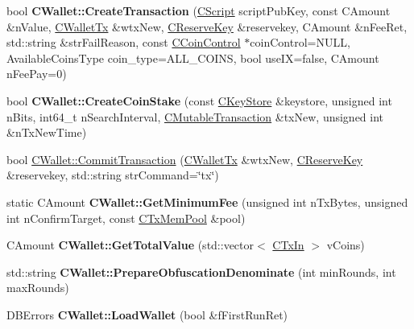 \begin{DoxyCompactItemize}
bool {\bfseries C\+Wallet\+::\+Create\+Transaction} (\mbox{\hyperlink{class_c_script}{C\+Script}} script\+Pub\+Key, const C\+Amount \&n\+Value, \mbox{\hyperlink{class_c_wallet_tx}{C\+Wallet\+Tx}} \&wtx\+New, \mbox{\hyperlink{class_c_reserve_key}{C\+Reserve\+Key}} \&reservekey, C\+Amount \&n\+Fee\+Ret, std\+::string \&str\+Fail\+Reason, const \mbox{\hyperlink{class_c_coin_control}{C\+Coin\+Control}} $\ast$coin\+Control=N\+U\+LL, Available\+Coins\+Type coin\+\_\+type=A\+L\+L\+\_\+\+C\+O\+I\+NS, bool use\+IX=false, C\+Amount n\+Fee\+Pay=0)
\item 
\mbox{\label{group___actions_gaa5c623fd859d4155b17386bc7b785983}} 
bool {\bfseries C\+Wallet\+::\+Create\+Coin\+Stake} (const \mbox{\hyperlink{class_c_key_store}{C\+Key\+Store}} \&keystore, unsigned int n\+Bits, int64\+\_\+t n\+Search\+Interval, \mbox{\hyperlink{struct_c_mutable_transaction}{C\+Mutable\+Transaction}} \&tx\+New, unsigned int \&n\+Tx\+New\+Time)
\item 
bool \mbox{\hyperlink{group___actions_gaa13fbeaebd271f910a54cc5b82d73fde}{C\+Wallet\+::\+Commit\+Transaction}} (\mbox{\hyperlink{class_c_wallet_tx}{C\+Wallet\+Tx}} \&wtx\+New, \mbox{\hyperlink{class_c_reserve_key}{C\+Reserve\+Key}} \&reservekey, std\+::string str\+Command=\char`\"{}tx\char`\"{})
\item 
\mbox{\label{group___actions_ga64a76474added26d9fbf904b5dd978a8}} 
static C\+Amount {\bfseries C\+Wallet\+::\+Get\+Minimum\+Fee} (unsigned int n\+Tx\+Bytes, unsigned int n\+Confirm\+Target, const \mbox{\hyperlink{class_c_tx_mem_pool}{C\+Tx\+Mem\+Pool}} \&pool)
\item 
\mbox{\label{group___actions_ga00962341815bf1374067f8ea5520c709}} 
C\+Amount {\bfseries C\+Wallet\+::\+Get\+Total\+Value} (std\+::vector$<$ \mbox{\hyperlink{class_c_tx_in}{C\+Tx\+In}} $>$ v\+Coins)
\item 
\mbox{\label{group___actions_ga704a957c88e9bef696dd30ddc95ad098}} 
std\+::string {\bfseries C\+Wallet\+::\+Prepare\+Obfuscation\+Denominate} (int min\+Rounds, int max\+Rounds)
\item 
\mbox{\label{group___actions_ga5d7b244b8ed0cbe24233ee0b6ca3cae0}} 
D\+B\+Errors {\bfseries C\+Wallet\+::\+Load\+Wallet} (bool \&f\+First\+Run\+Ret)
\item 

\end{DoxyCompactItemize}
